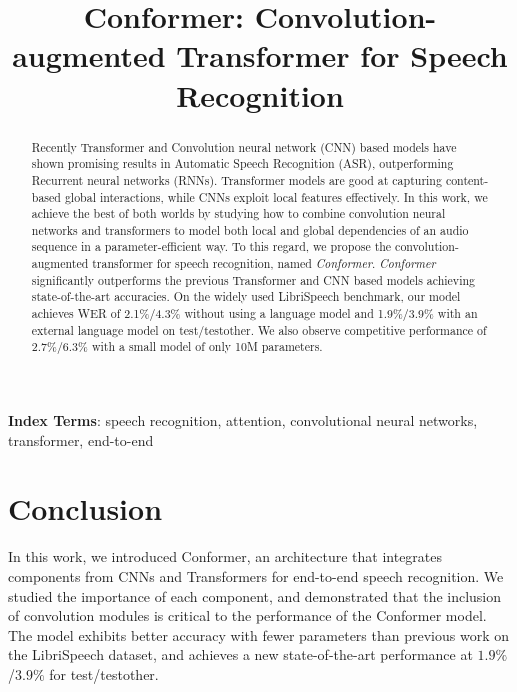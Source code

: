 \documentclass[a4paper]{article}
\title{Conformer: Convolution-augmented Transformer for Speech Recognition}
\begin{document}
\maketitle
\begin{abstract}
Recently Transformer and Convolution neural network (CNN) based models have shown promising results in Automatic Speech Recognition (ASR), outperforming Recurrent neural networks (RNNs). Transformer models are good at capturing content-based global interactions, while CNNs exploit local features effectively.
In this work, we achieve the best of both worlds by studying how to combine convolution neural networks and transformers to model both local and global dependencies of an audio sequence in a parameter-efficient way. To this regard, we propose the convolution-augmented transformer for speech recognition, named \textit{Conformer}. \textit{Conformer} significantly outperforms the previous Transformer and CNN based models achieving state-of-the-art accuracies. On the widely used LibriSpeech benchmark, our model achieves WER of 2.1\%/4.3\% without using a language model and 1.9\%/3.9\% with an external language model on test/testother. We also observe competitive performance of 2.7\%/6.3\% with a small model of only 10M parameters.

\end{abstract}
\noindent\textbf{Index Terms}: speech recognition, attention, convolutional neural networks, transformer, end-to-end





\section{Conclusion}
In this work,
we introduced Conformer, an architecture that integrates components from CNNs and Transformers for end-to-end speech recognition. We studied the importance of each component, and demonstrated that the inclusion of convolution modules is critical to the performance of the Conformer model.
The model exhibits better accuracy with fewer parameters than previous work on the LibriSpeech dataset, and achieves a new state-of-the-art performance at $1.9\%$/$3.9\%$ for test/testother.





\end{document}
